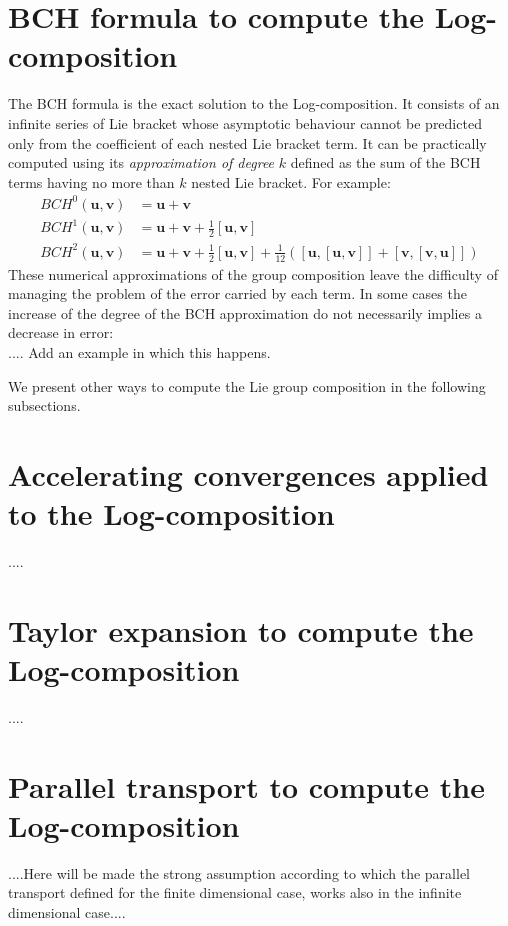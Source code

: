 \section{BCH formula to compute the Log-composition}

The BCH formula is the exact solution to the Log-composition. 
It consists of an infinite series of Lie bracket whose asymptotic behaviour cannot be predicted only from the coefficient of each nested Lie bracket term. It can be practically computed using its \emph{approximation of degree} $k$ defined as the sum of the BCH terms having no more than $k$ nested Lie bracket. For example:
\begin{align*}
BCH^{0}(\mathbf{u},\mathbf{v}) &= \mathbf{u} + \mathbf{v} \\
BCH^{1}(\mathbf{u},\mathbf{v}) &=  \mathbf{u} + \mathbf{v} + \frac{1}{2}[\mathbf{u},\mathbf{v}] \\
BCH^{2}(\mathbf{u},\mathbf{v}) &=  \mathbf{u} + \mathbf{v} + \frac{1}{2}[\mathbf{u},\mathbf{v}] + \frac{1}{12}([\mathbf{u},[\mathbf{u},\mathbf{v}]] + [\mathbf{v},[\mathbf{v},\mathbf{u}]])
\end{align*}
These numerical approximations of the group composition leave the difficulty of managing the problem of the error carried by each term. In some cases the increase of the degree of the BCH approximation do not necessarily implies a decrease in error: \\
.... Add an example in which this happens.

We present other ways to compute the Lie group composition in the following subsections.

\section{Accelerating convergences applied to the Log-composition}

....

\section{Taylor expansion to compute the Log-composition}

....


\section{Parallel transport to compute the Log-composition}

....Here will be made the strong assumption according to which the parallel transport defined for the finite dimensional case, works also in the infinite dimensional case....

